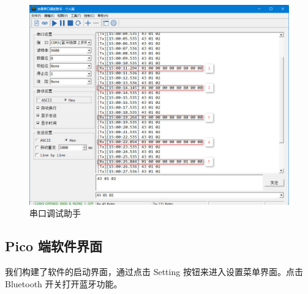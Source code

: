\documentclass[a4paper,10pt]{article}
\begin{document}
		\begin{figure}[htbp]
			\centering
			\includegraphics[width=0.7\linewidth]{"picture/Serial Port Assistant"}
			\caption{串口调试助手}
			\label{fig:serial-port-assistant}
		\end{figure}
			
	
		\subsection{Pico 端软件界面}
		
		我们构建了软件的启动界面，通过点击 Setting 按钮来进入设置菜单界面。点击 Bluetooth 开关打开蓝牙功能。
		
\end{document}
